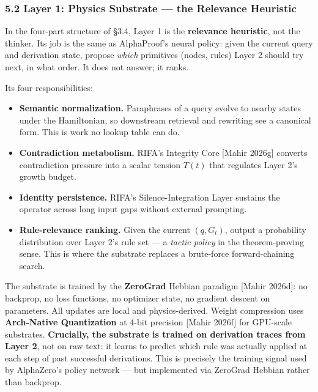 \documentclass[
  11pt,
  a4paper,
]{article}
\providecommand{\tightlist}{%
  \setlength{\itemsep}{0pt}\setlength{\parskip}{0pt}}
\begin{document}
\subsubsection{5.2 Layer 1: Physics Substrate --- the Relevance
Heuristic}\label{layer-1-physics-substrate-the-relevance-heuristic}

In the four-part structure of §3.4, Layer 1 is the \textbf{relevance
heuristic}, not the thinker. Its job is the same as AlphaProof's neural
policy: given the current query and derivation state, propose
\emph{which} primitives (nodes, rules) Layer 2 should try next, in what
order. It does not answer; it ranks.

Its four responsibilities:

\begin{itemize}
\tightlist
\item
  \textbf{Semantic normalization.} Paraphrases of a query evolve to
  nearby states under the Hamiltonian, so downstream retrieval and
  rewriting see a canonical form. This is work no lookup table can do.
\item
  \textbf{Contradiction metabolism.} RIFA's Integrity Core {[}Mahir
  2026g{]} converts contradiction pressure into a scalar tension
  \(T(t)\) that regulates Layer 2's growth budget.
\item
  \textbf{Identity persistence.} RIFA's Silence-Integration Layer
  sustains the operator across long input gaps without external
  prompting.
\item
  \textbf{Rule-relevance ranking.} Given the current \((q, G_t)\),
  output a probability distribution over Layer 2's rule set --- a
  \emph{tactic policy} in the theorem-proving sense. This is where the
  substrate replaces a brute-force forward-chaining search.
\end{itemize}

The substrate is trained by the \textbf{ZeroGrad} Hebbian paradigm
{[}Mahir 2026d{]}: no backprop, no loss functions, no optimizer state,
no gradient descent on parameters. All updates are local and
physics-derived. Weight compression uses \textbf{Arch-Native
Quantization} at 4-bit precision {[}Mahir 2026f{]} for GPU-scale
substrates. \textbf{Crucially, the substrate is trained on derivation
traces from Layer 2}, not on raw text: it learns to predict which rule
was actually applied at each step of past successful derivations. This
is precisely the training signal used by AlphaZero's policy network ---
but implemented via ZeroGrad Hebbian rather than backprop.
\end{document}
